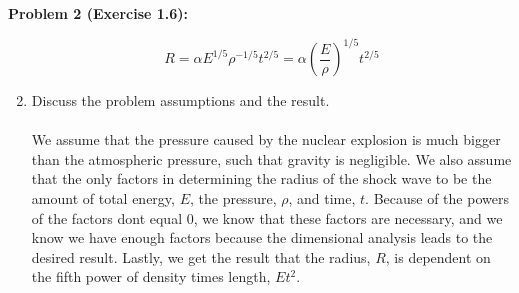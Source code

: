 \documentclass[11pt]{article}
\newenvironment{problem}[1]{\textbf{Problem #1: }}{\newpage}
\begin{document}
\begin{problem}{2 (Exercise 1.6)}
\begin{enumerate}[label = (\alph*)]
			\[R = \alpha E^{1/5}\rho^{-1/5}t^{2/5} = \alpha \left(\frac{E}{\rho}\right)^{1/5}t^{2/5}\]
			\item Discuss the problem assumptions and the result.
			\\ \\
			We assume that the pressure caused by the nuclear explosion is much bigger than the atmospheric pressure, such that gravity is negligible.  We also assume that the only factors in determining the radius of the shock wave to be the amount of total energy, $E$, the pressure, $\rho$, and time, $t$.  Because of the powers of the factors dont equal 0, we know that these factors are necessary, and we know we have enough factors because the dimensional analysis leads to the desired result. Lastly, we get the result that the radius, $R$, is dependent on the fifth power of density times length, $Et^2$.
		\end{enumerate}
	\end{problem}
	
\end{document}
